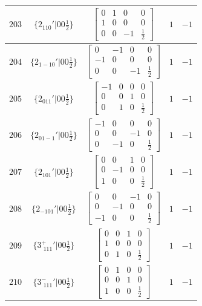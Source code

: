 \documentclass[fleqn,8pt]{jsarticle}
\begin{document}
\begin{longtable}{ccccc}
$ 203 $ & $ \{2{}_{110}{}'|0 0 \frac{1}{2}\} $ & $ \begin{bmatrix} 0 & 1 & 0 & 0 \\ 1 & 0 & 0 & 0 \\ 0 & 0 & -1 & \frac{1}{2} \end{bmatrix} $ & $ 1 $ & $ -1 $ \\ \hline
$ 204 $ & $ \{2{}_{1-10}{}'|0 0 \frac{1}{2}\} $ & $ \begin{bmatrix} 0 & -1 & 0 & 0 \\ -1 & 0 & 0 & 0 \\ 0 & 0 & -1 & \frac{1}{2} \end{bmatrix} $ & $ 1 $ & $ -1 $ \\ \hline
$ 205 $ & $ \{2{}_{011}{}'|0 0 \frac{1}{2}\} $ & $ \begin{bmatrix} -1 & 0 & 0 & 0 \\ 0 & 0 & 1 & 0 \\ 0 & 1 & 0 & \frac{1}{2} \end{bmatrix} $ & $ 1 $ & $ -1 $ \\ \hline
$ 206 $ & $ \{2{}_{01-1}{}'|0 0 \frac{1}{2}\} $ & $ \begin{bmatrix} -1 & 0 & 0 & 0 \\ 0 & 0 & -1 & 0 \\ 0 & -1 & 0 & \frac{1}{2} \end{bmatrix} $ & $ 1 $ & $ -1 $ \\ \hline
$ 207 $ & $ \{2{}_{101}{}'|0 0 \frac{1}{2}\} $ & $ \begin{bmatrix} 0 & 0 & 1 & 0 \\ 0 & -1 & 0 & 0 \\ 1 & 0 & 0 & \frac{1}{2} \end{bmatrix} $ & $ 1 $ & $ -1 $ \\ \hline
$ 208 $ & $ \{2{}_{-101}{}'|0 0 \frac{1}{2}\} $ & $ \begin{bmatrix} 0 & 0 & -1 & 0 \\ 0 & -1 & 0 & 0 \\ -1 & 0 & 0 & \frac{1}{2} \end{bmatrix} $ & $ 1 $ & $ -1 $ \\ \hline
$ 209 $ & $ \{3^{+}_{\,\,111}{}'|0 0 \frac{1}{2}\} $ & $ \begin{bmatrix} 0 & 0 & 1 & 0 \\ 1 & 0 & 0 & 0 \\ 0 & 1 & 0 & \frac{1}{2} \end{bmatrix} $ & $ 1 $ & $ -1 $ \\ \hline
$ 210 $ & $ \{3^{-}_{\,\,111}{}'|0 0 \frac{1}{2}\} $ & $ \begin{bmatrix} 0 & 1 & 0 & 0 \\ 0 & 0 & 1 & 0 \\ 1 & 0 & 0 & \frac{1}{2} \end{bmatrix} $ & $ 1 $ & $ -1 $ \\ \hline

\end{longtable}
\end{document}

